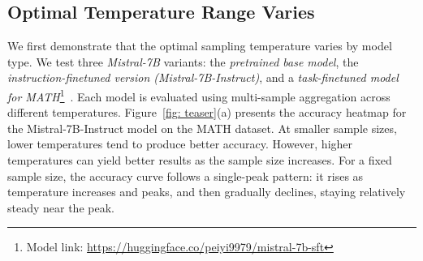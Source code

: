 
\subsection{Optimal Temperature Range Varies}
\label{sec: temperature varies}





We first demonstrate that the optimal sampling temperature varies by model type. We test three \emph{Mistral-7B} variants: the \emph{pretrained base model}, the \emph{instruction-finetuned version (Mistral-7B-Instruct)}, and a \emph{task-finetuned model for MATH}\footnote{Model link: \href{https://huggingface.co/peiyi9979/mistral-7b-sft}{https://huggingface.co/peiyi9979/mistral-7b-sft}}~\cite{wang2024math}. Each model is evaluated using multi-sample aggregation across different temperatures.
Figure~\ref{fig: teaser}(a) presents the accuracy heatmap for the Mistral-7B-Instruct model on the MATH dataset. At smaller sample sizes, lower temperatures tend to produce better accuracy. However, higher temperatures can yield better results as the sample size increases. For a fixed sample size, the accuracy curve follows a single-peak pattern: it rises as temperature increases and peaks, and then gradually declines, staying relatively steady near the peak.

